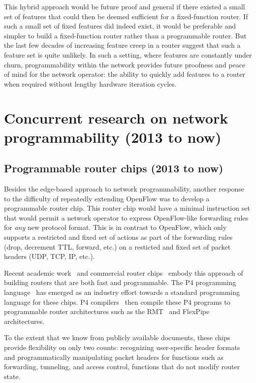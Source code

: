 This hybrid approach would be future proof and general if there existed a small
set of features that could then be deemed sufficient for a fixed-function
router. If such a small set of fixed features did indeed exist, it would be
preferable and simpler to build a fixed-function router rather than a
programmable router. But the last few decades of increasing feature creep in a
router suggest that such a feature set is quite unlikely. In such a setting,
where features are constantly under churn, programmability within the network
provides future proofness and peace of mind for the network operator: the
ability to quickly add features to a router when required without lengthy
hardware iteration cycles.

\section{Concurrent research on network programmability (2013 to now)}
\label{s:concurrent}

\subsection{Programmable router chips (2013 to now)}
\label{ss:prog_router_chips}
Besides the edge-based approach to network programmability, another response to
the difficulty of repeatedly extending OpenFlow was to develop a programmable
router chip. This router chip would have a minimal instruction set that would
permit a network operator to express OpenFlow-like forwarding rules for {\em
any} new protocol format. This is in contrast to OpenFlow, which only supports
a restricted and fixed set of actions as part of the forwarding rules (drop,
decrement TTL, forward, etc.) on a resticted and fixed set of packet headers
(UDP, TCP, IP, etc.).

Recent academic work~\cite{rmt} and commercial router chips~\cite{tofino,
flexpipe, xpliant} embody this approach of building routers that are both fast
and programmable. The P4 programming language~\cite{p4} has emerged as an
industry effort towards a standard programming language for these chips.  P4
compilers~\cite{lavanya_compiler} then compile these P4 programs to
programmable router architectures such as the RMT~\cite{rmt} and
FlexPipe~\cite{flexpipe} architectures.

To the extent that we know from publicly available documents, these chips
provide flexibility on only two counts: recognizing user-specific header
formats and programmatically manipulating packet headers for functions such as
forwarding, tunneling, and access control, \ie functions that do not modify
router state.

